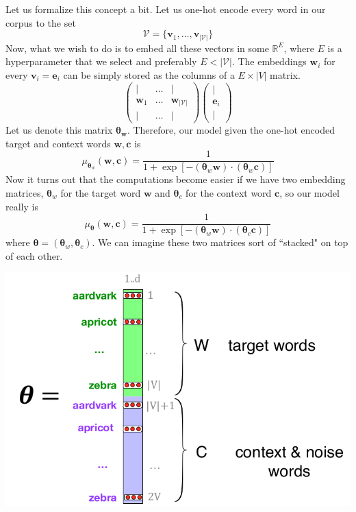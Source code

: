 \documentclass{article}
\begin{document}
      Let us formalize this concept a bit. Let us one-hot encode every word in our corpus to the set 
      \[\mathcal{V} = \{\mathbf{v}_1, \ldots, \mathbf{v}_{|\mathcal{V}|}\}\] 
      Now, what we wish to do is to embed all these vectors in some $\mathbb{R}^E$, where $E$ is a hyperparameter that we select and preferably $E < |\mathcal{V}|$. The embeddings $\mathbf{w}_i$ for every $\mathbf{v}_i = \mathbf{e}_i$ can be simply stored as the columns of a $E \times |V|$ matrix. 
      \[\begin{pmatrix} | & \ldots & | \\ \mathbf{w}_1 & \ldots & \mathbf{w}_{|\mathcal{V}|} \\ | & \ldots & | \end{pmatrix} \begin{pmatrix} | \\ \mathbf{e}_i \\ | \end{pmatrix}\]
      Let us denote this matrix $\boldsymbol{\theta}_\mathbf{w}$. Therefore, our model given the one-hot encoded target and context words $\mathbf{w}, \mathbf{c}$ is 
      \[\mu_{\boldsymbol{\theta}_w} (\mathbf{w}, \mathbf{c}) = \frac{1}{1 + \exp[-(\boldsymbol{\theta}_w \mathbf{w}) \cdot (\boldsymbol{\theta}_w \mathbf{c})]}\]
      Now it turns out that the computations become easier if we have two embedding matrices, $\boldsymbol{\theta}_w$ for the target word $\mathbf{w}$ and $\boldsymbol{\theta}_c$ for the context word $\mathbf{c}$, so our model really is 
      \[\mu_{\boldsymbol{\theta}} (\mathbf{w}, \mathbf{c}) = \frac{1}{1 + \exp[-(\boldsymbol{\theta}_w \mathbf{w}) \cdot (\boldsymbol{\theta}_c \mathbf{c})]}\]
      where $\boldsymbol{\theta} = (\boldsymbol{\theta}_w, \boldsymbol{\theta}_c)$. We can imagine these two matrices sort of ``stacked" on top of each other. 
      \begin{center}
          \includegraphics[scale=0.3]{img/word2vec_params.png}
      \end{center}
\end{document}
